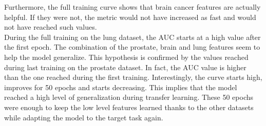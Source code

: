 Furthermore, the full training curve shows that brain cancer features are actually helpful. If they were not, the metric would not have increased as fast and would not have reached such values.\\
During the full training on the lung dataset, the AUC starts at a high value after the first epoch. The combination of the prostate, brain and lung features seem to help the model generalize. This hypothesis is confirmed by the values reached during last training on the prostate dataset. In fact, the AUC value is higher than the one reached during the first training. Interestingly, the curve starts high, improves for 50 epochs and starts decreasing. This implies that the model reached a high level of generalization during transfer learning. These 50 epochs were enough to keep the low level features learned thanks to the other datasets while adapting the model to the target task again. 

%
%


